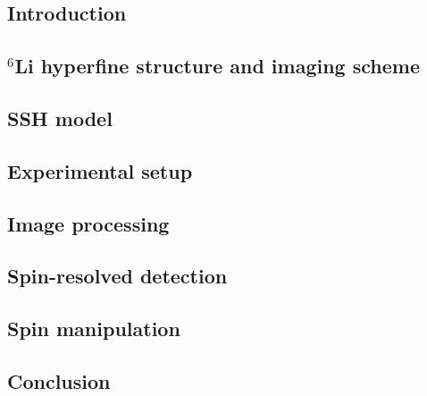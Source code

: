 \documentclass[twoside]{article}
\begin{document}
\subsection{Introduction} \label{subsec:imaging-motivation} %


\subsection{\texorpdfstring{$^6$Li}{6Li} hyperfine structure and imaging scheme} \label{subsec:imaging-hyperfine}


\subsection{SSH model} \label{subsec:imaging-ssh}

\subsection{Experimental setup} \label{subsec:imaging-setup}

\subsection{Image processing} \label{subsec:imaging-processing}

\subsection{Spin-resolved detection} \label{subsec:imaging-spin}

\subsection{Spin manipulation} \label{subsec:imaging-flip}


\subsection{Conclusion} \label{subsec:imaging-conclusion}

\end{document}

